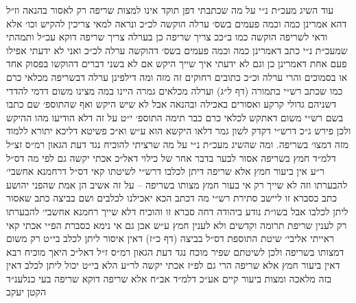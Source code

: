\documentclass[12pt, openany]{book}
\begin{document}
\begin{multicols}{2}
עוד השיג מעכ״ת נ״י על מה שכתבתי דפן תוקד אינו למצות שריפה רק לאסור בהנאה וז״ל דהא אמרינן כמה וכמה פעמים בשס׳ ערלה הוקשה לכ״כ ונראה למאי צריכין להקיש וכו׳ אלא ודאי לשריפה הוקשה כמו ב״ככ צריך שריפה כן בערלה צריך שריפה דוקא עכ״ל ותמהתי שמעכ״ת נ״י כתב דאמרינן כמה וכמה פעמים בשס׳ דהוקשה ערלה לכ״כ ואני לא ידעתי אפילו פעם אחת דאמרינן כן וגם לא ידעתי איך שייך היקש אם לא בשני דברים דהוקשו בפסוק אחד או בסמוכים והרי ערלה וכ״כ כתובים רחוקים זה מזה ומה דילפינן ערלה דבשריפה מכלאי כרם כמו שכתב רש״י בתמורה (דף ל״ג) וערלה מכלאים גמרה היינו במה מצינו משום דדמי להדדי דשניהם גדולי קרקע ואסורים באכילה ובהנאה אבל לא שיש היקש ואף שהתוספ׳ שם כתבו בשם רש״י משום דאתקש לכלאי כרם כבר תימה התוספ׳ י״ט על זה דלא הודיעו מהו ההיקש ולכן פירש ג״כ דרש״י דקדק לשון גמר דלאו היקשא הוא ע״ש וא״כ פשיטא דליכא יתורא ללמוד מזה דמצו׳ בשריפה. ומה שהשיג מעכ״ת נ״י על מה שרציתי להוכיח נגד דעת הגאון רמ״ס זצ״ל דלמ״ד חמץ בשריפה אסור לבער בדבר אחר של כילוי דאל״כ אכתי יקשה גם לפי מה דס״ל ר״ע אין ביעור חמץ אלא שריפה דיתן לכלבו דרש״י לשיטתו קאי דס״ל דרחמנא אחשבי׳ להבערתו וזה לא שייך רק אי בעור חמץ מצותו בשריפה – על זה אשיב הן אמת שהפני יהושע כתב כסברא זו ליישב סתירת רש״י מה דכתב הכא יאכילנו לכלבים ושם בביצה כתב שאסור ליתן לכלבו אבל בשו״ת נודע ביהודה דחה סברא זו והוכיח דלא שייך רחמנא אחשבי׳ להבערתו רק לענין שריפת תרומה וקדשים ולא לענין חמץ ע״ש אכן גם אי נימא כסברת הפ״י אכתי קאי ראייתי אליבי׳ שיטת התוספת דס״ל בביצה (דף כ״ז) דאין איסור ליתן לכלב בי״ט רק משום דמצותו בשריפה ולכן לשיטתם שפיר מוכח נגד דעת הגאון רמ״ס ז״ל דאל״כ היאך מוכיח רבא דאין ביעור חמץ אלא שריפה הרי גם לפ״ז אכתי יקשה לר״ע הלא בי״ט יכול ליתן לכלב דאין בזה מלאכה ומצות ביעור קיים אע״כ דלמ״ד אב״ח אלא שריפה דוקא שריפה בעי כנלענ״ד הקטן יעקב\\\vspace{0pt}

\end{multicols}\newpage
\end{document}
